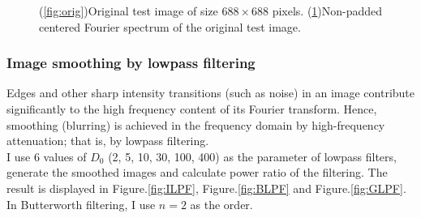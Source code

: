 \begin{figure}[h!]
\begin{subfigure}[b]{0.45\linewidth}
		\caption{}
		\label{fig:spectrum}
	\end{subfigure}
  	\caption{(\ref{fig:orig})Original test image of size $688\times 688$ pixels. (\ref{fig:spectrum})Non-padded centered Fourier spectrum of the original test image.}
  	\label{fig:origin3}
\end{figure}


\subsubsection{Image smoothing by lowpass filtering}
Edges and other sharp intensity transitions (such as noise) in an image contribute significantly to the high frequency content of its Fourier transform. Hence, smoothing (blurring) is achieved in the frequency domain by high-frequency attenuation; that is, by lowpass filtering. \\

I use 6 values of $D_0$ (2, 5, 10, 30, 100, 400) as the parameter of lowpass filters, generate the smoothed images and calculate power ratio of the filtering. The result is displayed in Figure.\ref{fig:ILPF}, Figure.\ref{fig:BLPF} and Figure.\ref{fig:GLPF}. In Butterworth filtering, I use $n=2$ as the order. 


